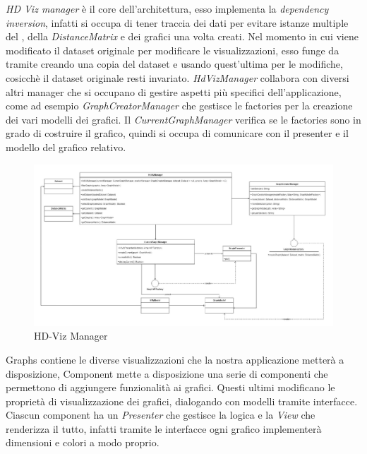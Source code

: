 \documentclass[../manuale_sviluppatore.tex]{subfiles}
\begin{document}
\emph{HD Viz manager} è il core dell'architettura, esso implementa la \emph{dependency inversion}, 
infatti si occupa di tener traccia dei dati per evitare istanze multiple del , 
della \emph{DistanceMatrix} e dei grafici una volta creati. 
Nel momento in cui viene modificato il dataset originale per modificare le visualizzazioni, esso 
funge da tramite creando una copia del dataset e usando quest'ultima per le modifiche, cosicchè il 
dataset originale resti invariato.
\emph{HdVizManager} collabora con diversi altri manager che si occupano di gestire aspetti più 
specifici dell'applicazione, come ad esempio \emph{GraphCreatorManager} che gestisce le factories 
per la creazione dei vari modelli dei grafici. 
Il \emph{CurrentGraphManager} verifica se le factories sono in grado di costruire il grafico, 
quindi si occupa di comunicare con il presenter e il modello del grafico relativo. \\


\begin{figure}[H]
	\centering
	\includegraphics[width=18cm]{img/core-hdvizmanager.jpg}
	\caption{HD-Viz Manager}
\end{figure}

Graphs contiene le diverse visualizzazioni che la nostra applicazione metterà a disposizione, Component mette a disposizione una serie di componenti che permettono di aggiungere funzionalità ai grafici.
Questi ultimi modificano le proprietà di visualizzazione dei grafici, dialogando con modelli tramite interfacce. Ciascun component ha un \emph{Presenter} che gestisce la logica e la \emph{View} che renderizza il tutto,
infatti tramite le interfacce ogni grafico implementerà dimensioni e colori a modo proprio.
\end{document}
